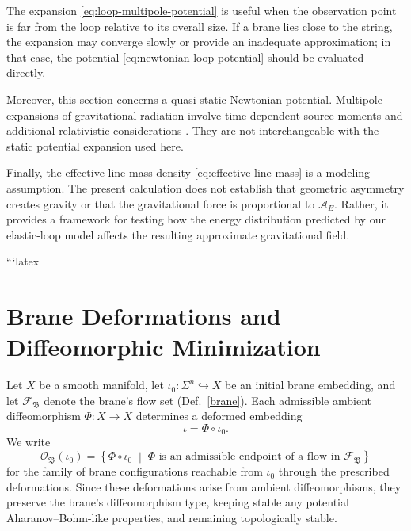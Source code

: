 \documentclass{article}
\numberwithin{tm}{section}
\numberwithin{dn}{section}
\numberwithin{as}{section}
\numberwithin{rk}{section}
\numberwithin{lem}{section}
\numberwithin{ax}{section}
\numberwithin{pp}{section}
\numberwithin{eg}{section}
\numberwithin{war}{section}
\numberwithin{equation}{section}
\numberwithin{prop}{section}
\numberwithin{nt}{section}
\numberwithin{rc}{section}
\begin{document}
The expansion \eqref{eq:loop-multipole-potential} is useful
when the observation point is far from the loop relative
to its overall size. If a brane lies close to the string,
the expansion may converge slowly or provide an inadequate
approximation; in that case, the potential
\eqref{eq:newtonian-loop-potential} should be evaluated
directly.

Moreover, this section concerns a quasi-static Newtonian
potential. Multipole expansions of gravitational radiation
involve time-dependent source moments and additional
relativistic considerations \cite{Thorne1980MultipoleRadiation}.
They are not interchangeable with the static potential
expansion used here.

Finally, the effective line-mass density
\eqref{eq:effective-line-mass} is a modeling assumption.
The present calculation does not establish that geometric
asymmetry creates gravity or that the gravitational force
is proportional to $\mathcal{A}_E$. Rather, it provides
a framework for testing how the energy distribution
predicted by our elastic-loop model affects the resulting
approximate gravitational field.

```latex
\section{Brane Deformations and Diffeomorphic Minimization}
\label{sec:brane-deformations}

Let \(X\) be a smooth manifold, let
\(\iota_0:\Sigma^n\hookrightarrow X\) be an initial brane embedding,
and let \(\mathcal F_{\mathfrak B}\) denote the brane's flow set (Def.~\ref{brane}).
Each admissible ambient diffeomorphism \(\Phi:X\to X\) determines
a deformed embedding
\[
\iota=\Phi\circ\iota_0.
\]
We write
\[
\mathcal O_{\mathfrak B}(\iota_0)
=
\left\{
\Phi\circ\iota_0
\;\middle|\;
\Phi \text{ is an admissible endpoint of a flow in }
\mathcal F_{\mathfrak B}
\right\}
\]
for the family of brane configurations reachable from
\(\iota_0\) through the prescribed deformations. Since these
deformations arise from ambient diffeomorphisms, they preserve the
brane's diffeomorphism type, keeping stable any potential Aharanov--Bohm-like properties, and remaining topologically stable.
\end{document}

